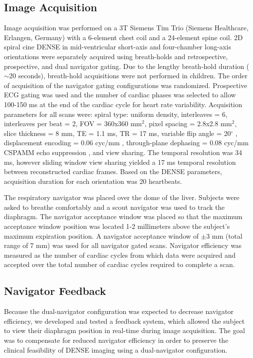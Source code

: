 \subsection{Image Acquisition}
	Image acquisition was performed on a 3T Siemens Tim Trio (Siemens Healthcare, Erlangen, Germany) with a 6-element chest coil and a 24-element spine coil. 2D spiral cine DENSE \cite{Zhong2010a,Wehner2015} in mid-ventricular short-axis and four-chamber long-axis orientations were separately acquired using breath-holds and retrospective, prospective, and dual navigator gating. Due to the lengthy breath-hold duration ($\sim$20 seconds), breath-hold acquisitions were not performed in children. The order of acquisition of the navigator gating configurations was randomized. Prospective ECG gating was used and the number of cardiac phases was selected to allow 100-150 ms at the end of the cardiac cycle for heart rate variability. Acquisition parameters for all scans were: spiral type: uniform density, interleaves = 6, interleaves per beat = 2, FOV = 360x360 mm$^2$, pixel spacing = 2.8x2.8 mm$^2$, slice thickness = 8 mm, TE = 1.1 ms, TR = 17 ms, variable flip angle = 20$^{\circ}$ \cite{Wehner2015,Stuber1999}, displacement encoding = 0.06 cyc/mm \cite{Wehner2015a}, through-plane dephasing = 0.08 cyc/mm \cite{Zhong2006a} CSPAMM echo suppression \cite{Kim2004}, and view sharing. The temporal resolution was 34 ms, however sliding window view sharing yielded a 17 ms temporal resolution between reconstructed cardiac frames. Based on the DENSE parameters, acquisition duration for each orientation was 20 heartbeats.
	
	The respiratory navigator was placed over the dome of the liver. Subjects were asked to breathe comfortably and a scout navigator was used to track the diaphragm. The navigator acceptance window was placed so that the maximum acceptance window position was located 1-2 millimeters above the subject's maximum expiration position. A navigator acceptance window of $\pm$3 mm (total range of 7 mm) was used for all navigator gated scans. Navigator efficiency was measured as the number of cardiac cycles from which data were acquired and accepted over the total number of cardiac cycles required to complete a scan.

\subsection{Navigator Feedback}
	Because the dual-navigator configuration was expected to decrease navigator efficiency, we developed and tested a feedback system, which allowed the subject to view their diaphragm position in real-time during image acquisition. The goal was to compensate for reduced navigator efficiency in order to preserve the clinical feasibility of DENSE imaging using a dual-navigator configuration.
	
